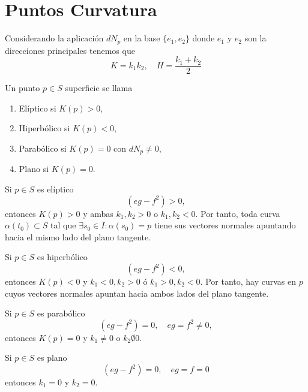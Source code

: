 \section{Puntos Curvatura}

\begin{note}
  Considerando la aplicación $dN_{p}$ en la base $\{ e_{1}, e_{2} \}$ donde $e_{1}$ y $e_{2}$ son la direcciones principales tenemos que
  \[ 
    K = k_{1} k_{2}, \quad H = \frac{k_{1} + k_{2}}{2}
  \] 
\end{note}

\begin{defn}
  Un punto $p \in S$ superficie se llama
  \begin{enumerate}[label=(\roman*)]
    \item Elíptico si $K(p) > 0$,
    \item Hiperbólico si $K(p) < 0$,
    \item Parabólico si $K(p) = 0$ con $dN_{p} \neq 0$,
    \item Plano si $K(p) = 0$.
  \end{enumerate}
\end{defn}

\begin{obs}
  Si $p \in S$ es elíptico
  \[
    (eg -f^{2}) > 0,
  \]
  entonces $K(p) > 0$ y ambas $k_{1}, k_{2} > 0$ o $k_{1}, k_{2} < 0$. Por tanto, toda curva $\alpha(t_{0}) \subset S$ tal que $\exists s_{0} \in I : \alpha(s_{0}) = p$  tiene sus vectores normales apuntando hacia el mismo lado del plano tangente.
\end{obs}

\begin{obs}
  Si $p \in S$ es hiperbólico
  \[
    (eg -f^{2}) < 0,
  \]
  entonces $K(p) < 0$ y $k_{1} < 0, k_{2} > 0$ ó $k_{1} > 0, k_{2} < 0$. Por tanto, hay curvas en $p$ cuyos vectores normales apuntan hacia ambos lados del plano tangente.
\end{obs}

\begin{obs}
  Si $p \in S$ es parabólico
  \[
    (eg -f^{2}) = 0, \quad eg = f^{2} \neq 0,
  \]
  entonces $K(p) = 0$ y $k_{1} \neq 0$ o $k_{2} \emptyset 0$.
\end{obs}

\begin{obs}
  Si $p \in S$ es plano
  \[ 
  (eg - f^{2}) = 0, \quad eg = f = 0 
  \]
  entonces $k_{1} = 0$ y $k_{2} = 0$.
\end{obs}

